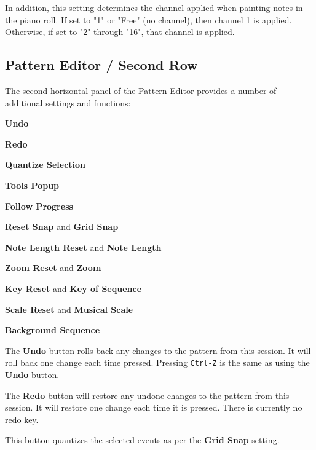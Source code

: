    In addition, this setting determines the channel applied when painting notes
   in the piano roll.  If set to "1" or "Free" (no channel), then channel 1 is
   applied.  Otherwise, if set to "2" through "16", that channel is applied.

\subsection{Pattern Editor / Second Row}
\label{subsec:pattern_editor_second_row}

   The second horizontal panel of the Pattern Editor provides a number
   of additional settings and functions:

   \begin{enumber}
      \item \textbf{Undo}
      \item \textbf{Redo}
      \item \textbf{Quantize Selection}
      \item \textbf{Tools Popup}
      \item \textbf{Follow Progress}
      \item \textbf{Reset Snap} and \textbf{Grid Snap}
      \item \textbf{Note Length Reset} and \textbf{Note Length}
      \item \textbf{Zoom Reset} and \textbf{Zoom}
      \item \textbf{Key Reset} and \textbf{Key of Sequence}
      \item \textbf{Scale Reset} and \textbf{Musical Scale}
      \item \textbf{Background Sequence}
   \end{enumber}

   \setcounter{ItemCounter}{0}      %

   The \textbf{Undo} button rolls back any changes to the pattern from this
   session.  It will roll back one change each time pressed.
   Pressing \texttt{Ctrl-Z} is the same as using the \textbf{Undo} button.

   The \textbf{Redo} button will restore any undone changes to the pattern from
   this session.
   It will restore one change each time it is pressed.
   There is currently no redo key.

   This button quantizes the selected events as per
   the \textbf{Grid Snap} setting.

